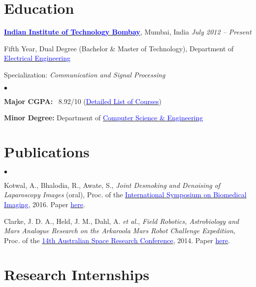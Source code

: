 \documentclass[margin,line]{res}
\newenvironment{list1}{
  \begin{list}{\ding{113}}{%
      \setlength{\itemsep}{0in}
      \setlength{\parsep}{0in} \setlength{\parskip}{0in}
      \setlength{\topsep}{0in} \setlength{\partopsep}{0in} 
      \setlength{\leftmargin}{0.17in}}}{\end{list}}
\newenvironment{list2}{
  \begin{list}{$\bullet$}{%
      \setlength{\itemsep}{0in}
      \setlength{\parsep}{0in} \setlength{\parskip}{0in}
      \setlength{\topsep}{0in} \setlength{\partopsep}{0in} 
      \setlength{\leftmargin}{0.2in}}}{\end{list}}
\begin{document}
\begin{resume}
\section{\sc Education}
{\bf \href{http://www.iitb.ac.in/}{\textcolor{blue}{Indian Institute of Technology Bombay}}}, Mumbai, India \hfill {\it July 2012 -- Present} \\
\vspace*{-.1in}
\begin{list1}
\item[] Fifth Year, Dual Degree (Bachelor \& Master of Technology), Department of \href{http://www.ee.iitb.ac.in/}{\textcolor{blue}{Electrical Engineering}}
\item[] Specialization: {\em Communication and Signal Processing}
\begin{list2}
\vspace*{.05in}
\item \textbf{Major CGPA:}  \ 8.92/10 (\hyperlink{crselst}{\textcolor{blue}{Detailed List of Courses}})
\item \textbf{Minor Degree:}  Department of \href{http://www.cse.iitb.ac.in/}{\textcolor{blue}{Computer Science \& Engineering}}
\end{list2}
\end{list1}

\section{\sc Publications}
\begin{list2}
\item Kotwal, A., Bhalodia, R., Awate, S., {\em Joint Desmoking and Denoising of Laparoscopy Images} (oral), Proc. of the \href{http://biomedicalimaging.org/2016/}{\textcolor{blue} {International Symposium on Biomedical Imaging}}, 2016. Paper \href{http://alankarkotwal.github.io/pubs/lap-dehazing.pdf}{\textcolor{blue} {here}}.
\item Clarke, J. D. A., Held, J. M., Dahl, A. {\em et al.}, {\em Field Robotics, Astrobiology and Mars Analogue Research on the Arkaroola Mars Robot Challenge Expedition}, Proc. of the \href{http://www.nssa.com.au/14asrc/14ASRC-proceedings.zip}{\textcolor{blue} {14th Australian Space Research Conference}}, 2014. Paper \href{http://alankarkotwal.github.io/pubs/Arkaroola.pdf}{\textcolor{blue} {here}}.
\end{list2}

\section{\sc Research Internships} 


\end{resume}
\end{document}
